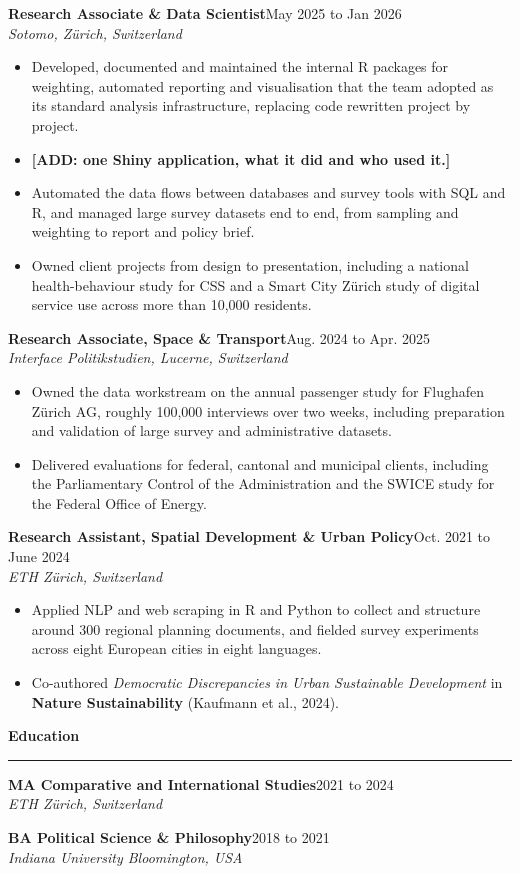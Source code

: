 \documentclass[10pt,a4paper]{article}
\newcommand{\cvsection}[1]{%
  \vspace{0.38em}\par
  {\color{cvblue}\large\bfseries #1}\par
  \vspace{-0.28em}\textcolor{cvblue}{\rule{\linewidth}{0.6pt}}\par
  \vspace{0.26em}}
\newcommand{\cventry}[3]{\vspace{0.32em}\textbf{#1}\hfill #3\\[1pt]\textit{#2}\par\vspace{0pt}}
\begin{document}
\cventry{Research Associate \& Data Scientist}{Sotomo, Zürich, Switzerland}{May 2025 to Jan 2026}
\begin{itemize}
\item Developed, documented and maintained the internal R packages for weighting, automated reporting and visualisation that the team adopted as its standard analysis infrastructure, replacing code rewritten project by project.
\item \textbf{[ADD: one Shiny application, what it did and who used it.]}
\item Automated the data flows between databases and survey tools with SQL and R, and managed large survey datasets end to end, from sampling and weighting to report and policy brief.
\item Owned client projects from design to presentation, including a national health-behaviour study for CSS and a Smart City Zürich study of digital service use across more than 10,000 residents.
\end{itemize}

\cventry{Research Associate, Space \& Transport}{Interface Politikstudien, Lucerne, Switzerland}{Aug. 2024 to Apr. 2025}
\begin{itemize}
\item Owned the data workstream on the annual passenger study for Flughafen Zürich AG, roughly 100,000 interviews over two weeks, including preparation and validation of large survey and administrative datasets.
\item Delivered evaluations for federal, cantonal and municipal clients, including the Parliamentary Control of the Administration and the SWICE study for the Federal Office of Energy.
\end{itemize}

\cventry{Research Assistant, Spatial Development \& Urban Policy}{ETH Zürich, Switzerland}{Oct. 2021 to June 2024}
\begin{itemize}
\item Applied NLP and web scraping in R and Python to collect and structure around 300 regional planning documents, and fielded survey experiments across eight European cities in eight languages.
\item Co-authored \textit{Democratic Discrepancies in Urban Sustainable Development} in \textbf{Nature Sustainability} (Kaufmann et al., 2024).
\end{itemize}

\cvsection{Education}

\cventry{MA Comparative and International Studies}{ETH Zürich, Switzerland}{2021 to 2024}
\cventry{BA Political Science \& Philosophy}{Indiana University Bloomington, USA}{2018 to 2021}
\end{document}
